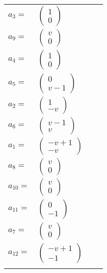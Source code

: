 \documentclass[1p]{elsarticle_modified}
\theoremstyle{definition}
\begin{document}
\begin{tabular}{m{7pt} m{180pt} m{7pt} m{180pt} }
\flushright $a_{3}=$&$\begin{pmatrix}1\\0\end{pmatrix}$ \\
\flushright $a_{9}=$&$\begin{pmatrix}v\\0\end{pmatrix}$ \\
\flushright $a_{4}=$&$\begin{pmatrix}1\\0\end{pmatrix}$ \\
\flushright $a_{5}=$&$\begin{pmatrix}0\\v-1\end{pmatrix}$ \\
\flushright $a_{2}=$&$\begin{pmatrix}1\\- v\end{pmatrix}$ \\
\flushright $a_{6}=$&$\begin{pmatrix}v-1\\v\end{pmatrix}$ \\
\flushright $a_{1}=$&$\begin{pmatrix}- v+1\\- v\end{pmatrix}$ \\
\flushright $a_{8}=$&$\begin{pmatrix}v\\0\end{pmatrix}$ \\
\flushright $a_{10}=$&$\begin{pmatrix}v\\0\end{pmatrix}$ \\
\flushright $a_{11}=$&$\begin{pmatrix}0\\-1\end{pmatrix}$ \\
\flushright $a_{7}=$&$\begin{pmatrix}v\\0\end{pmatrix}$ \\
\flushright $a_{12}=$&$\begin{pmatrix}- v+1\\-1\end{pmatrix}$\\&\end{tabular}
\end{document}
